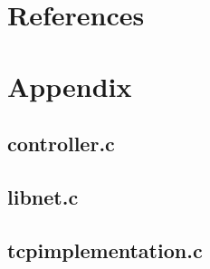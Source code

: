 \documentclass{article}
\begin{document}
\section*{References}

\printbibliography

\section*{Appendix}

\subsection*{controller.c}


\subsection*{libnet.c}


\subsection*{tcp\textunderscore implementation.c}

\end{document}
